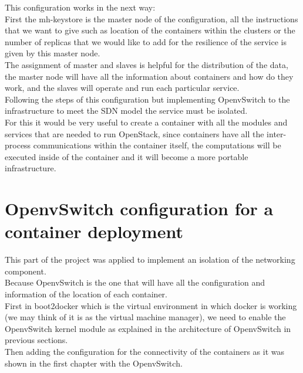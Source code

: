 This configuration works in the next way: \\

First the mh-keystore is the master node of the configuration, all the instructions that we want to give such as location of the containers within the clusters or the number of replicas that we would like to add for the resilience of the service is given by this master node.\\

The assignment of master and slaves is helpful for the distribution of the data, the master node will have all the information about containers and how do they work, and the slaves will operate and run each particular service.\\


Following the steps of this configuration but implementing OpenvSwitch to the infrastructure to meet the SDN model the service must be isolated.\\

For this it would be very useful to create a container with all the modules and services that are needed to run OpenStack, since containers have all the inter-process communications within the container itself, the computations will be executed inside of the container and it will become a more portable infrastructure.\\

\section{OpenvSwitch configuration for a container deployment}

This part of the project was applied to implement an isolation of the networking component.\\

Because OpenvSwitch is the one that will have all the configuration and information of the location of each container.\\

First in boot2docker which is the virtual environment in which docker is working (we may think of it is as the virtual machine manager), we need to enable the OpenvSwitch kernel module as explained in the architecture of OpenvSwitch in previous sections.\\

Then adding the configuration for the connectivity of the containers as it was shown in the first chapter with the OpenvSwitch.\\

